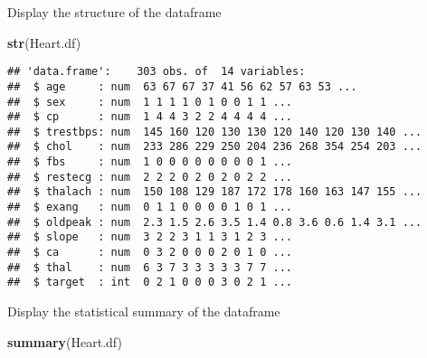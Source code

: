 \documentclass[
]{article}
\newenvironment{Shaded}{\begin{snugshade}}{\end{snugshade}}
\newcommand{\FunctionTok}[1]{\textcolor[rgb]{0.13,0.29,0.53}{\textbf{#1}}}
\newcommand{\NormalTok}[1]{#1}
\begin{document}
Display the structure of the dataframe

\begin{Shaded}
\begin{Highlighting}[]
\FunctionTok{str}\NormalTok{(Heart.df)}
\end{Highlighting}
\end{Shaded}

\begin{verbatim}
## 'data.frame':    303 obs. of  14 variables:
##  $ age     : num  63 67 67 37 41 56 62 57 63 53 ...
##  $ sex     : num  1 1 1 1 0 1 0 0 1 1 ...
##  $ cp      : num  1 4 4 3 2 2 4 4 4 4 ...
##  $ trestbps: num  145 160 120 130 130 120 140 120 130 140 ...
##  $ chol    : num  233 286 229 250 204 236 268 354 254 203 ...
##  $ fbs     : num  1 0 0 0 0 0 0 0 0 1 ...
##  $ restecg : num  2 2 2 0 2 0 2 0 2 2 ...
##  $ thalach : num  150 108 129 187 172 178 160 163 147 155 ...
##  $ exang   : num  0 1 1 0 0 0 0 1 0 1 ...
##  $ oldpeak : num  2.3 1.5 2.6 3.5 1.4 0.8 3.6 0.6 1.4 3.1 ...
##  $ slope   : num  3 2 2 3 1 1 3 1 2 3 ...
##  $ ca      : num  0 3 2 0 0 0 2 0 1 0 ...
##  $ thal    : num  6 3 7 3 3 3 3 3 7 7 ...
##  $ target  : int  0 2 1 0 0 0 3 0 2 1 ...
\end{verbatim}

Display the statistical summary of the dataframe

\begin{Shaded}
\begin{Highlighting}[]
\FunctionTok{summary}\NormalTok{(Heart.df)}
\end{Highlighting}
\end{Shaded}
\end{document}
